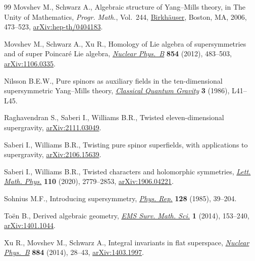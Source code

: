 \documentclass[pdftex]{sigma}
\numberwithin{equation}{section}
\begin{document}
\begin{thebibliography}{99}
Movshev M., Schwarz A., Algebraic structure of {Y}ang--{M}ills theory, in The
 Unity of Mathematics, \textit{Progr. Math.}, Vol.~244, \href{https://doi.org/10.1007/0-8176-4467-9_14}{Birkh\"auser},
 Boston, MA, 2006, 473--523, \href{https://arxiv.org/abs/hep-th/0404183}{arXiv:hep-th/0404183}.

Movshev M., Schwarz A., Xu R., Homology of {L}ie algebra of supersymmetries and
 of super {P}oincar\'e {L}ie algebra, \href{https://doi.org/10.1016/j.nuclphysb.2011.08.023}{\textit{Nuclear Phys.~B}} \textbf{854}
 (2012), 483--503, \href{https://arxiv.org/abs/1106.0335}{arXiv:1106.0335}.

Nilsson B.E.W., Pure spinors as auxiliary fields in the ten-dimensional
 supersymmetric {Y}ang--{M}ills theory, \href{https://doi.org/10.1088/0264-9381/3/2/007}{\textit{Classical Quantum Gravity}}
 \textbf{3} (1986), L41--L45.

Raghavendran S., Saberi I., Williams B.R., Twisted eleven-dimensional
 supergravity, \href{https://arxiv.org/abs/2111.03049}{arXiv:2111.03049}.

Saberi I., Williams B.R., Twisting pure spinor superfields, with applications
 to supergravity, \href{https://arxiv.org/abs/2106.15639}{arXiv:2106.15639}.

Saberi I., Williams B.R., Twisted characters and holomorphic symmetries,
 \href{https://doi.org/10.1007/s11005-020-01319-4}{\textit{Lett. Math. Phys.}} \textbf{110} (2020), 2779--2853,
 \href{https://arxiv.org/abs/1906.04221}{arXiv:1906.04221}.

Sohnius M.F., Introducing supersymmetry, \href{https://doi.org/10.1016/0370-1573(85)90023-7}{\textit{Phys. Rep.}} \textbf{128}
 (1985), 39--204.

To\"en B., Derived algebraic geometry, \href{https://doi.org/10.4171/EMSS/4}{\textit{EMS Surv. Math. Sci.}} \textbf{1}
 (2014), 153--240, \href{https://arxiv.org/abs/1401.1044}{arXiv:1401.1044}.

Xu R., Movshev M., Schwarz A., Integral invariants in flat superspace,
 \href{https://doi.org/10.1016/j.nuclphysb.2014.04.009}{\textit{Nuclear Phys.~B}} \textbf{884} (2014), 28--43, \href{https://arxiv.org/abs/1403.1997}{arXiv:1403.1997}.

\end{thebibliography}\LastPageEnding
\end{document}
